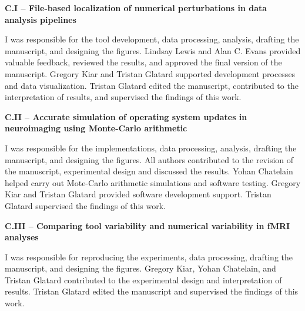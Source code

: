\textbf{C.I – File-based localization of numerical perturbations in data analysis pipelines}

I was responsible for the tool development, data processing, analysis, drafting the manuscript, and designing the figures.
Lindsay Lewis and Alan C. Evans provided valuable feedback, reviewed the results, and approved the final version of the manuscript.
Gregory Kiar and Tristan Glatard supported development processes and data visualization.
Tristan Glatard edited the manuscript, contributed to the interpretation of results, and supervised the findings of this work.

\textbf{C.II – Accurate simulation of operating system updates in neuroimaging using Monte-Carlo arithmetic}

I was responsible for the implementations, data processing, analysis, drafting the manuscript, and designing the figures.
All authors contributed to the revision of the manuscript, experimental design and discussed the results.
Yohan Chatelain helped carry out Mote-Carlo arithmetic simulations and software testing.
Gregory Kiar and Tristan Glatard provided software development support.
Tristan Glatard supervised the findings of this work.

\textbf{C.III – Comparing tool variability and numerical variability in fMRI analyses}

I was responsible for reproducing the experiments, data processing, drafting the manuscript, and designing the figures.
Gregory Kiar, Yohan Chatelain, and Tristan Glatard contributed to the experimental design and interpretation of results.
Tristan Glatard edited the manuscript and supervised the findings of this work.

